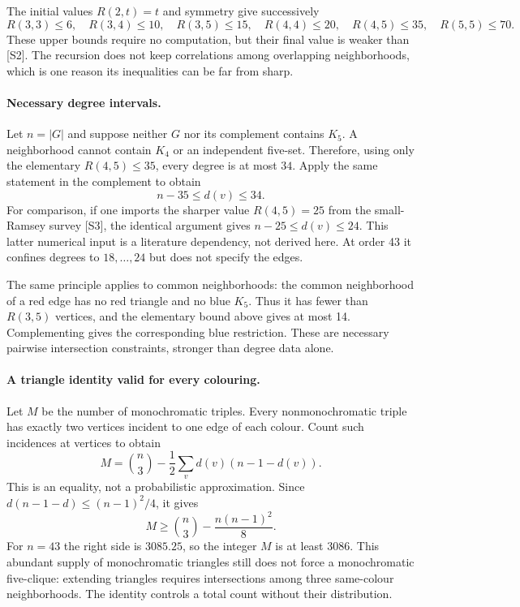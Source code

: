 \documentclass[11pt,a4paper]{article}
\begin{document}
The initial values $R(2,t)=t$ and symmetry give successively
\[
R(3,3)\le6,\quad R(3,4)\le10,\quad R(3,5)\le15,
\quad R(4,4)\le20,\quad R(4,5)\le35,
\quad R(5,5)\le70.
\]
These upper bounds require no computation, but their final value is weaker than [S2]. The recursion does not keep correlations among overlapping neighborhoods, which is one reason its inequalities can be far from sharp.

\paragraph{Necessary degree intervals.}
Let $n=|G|$ and suppose neither $G$ nor its complement contains $K_5$. A neighborhood cannot contain $K_4$ or an independent five-set. Therefore, using only the elementary $R(4,5)\le35$, every degree is at most $34$. Apply the same statement in the complement to obtain
\[
n-35\le d(v)\le34.
\]
For comparison, if one imports the sharper value $R(4,5)=25$ from the small-Ramsey survey [S3], the identical argument gives $n-25\le d(v)\le24$. This latter numerical input is a literature dependency, not derived here. At order 43 it confines degrees to $18,\ldots,24$ but does not specify the edges.

The same principle applies to common neighborhoods: the common neighborhood of a red edge has no red triangle and no blue $K_5$. Thus it has fewer than $R(3,5)$ vertices, and the elementary bound above gives at most 14. Complementing gives the corresponding blue restriction. These are necessary pairwise intersection constraints, stronger than degree data alone.

\paragraph{A triangle identity valid for every colouring.}
Let $M$ be the number of monochromatic triples. Every nonmonochromatic triple has exactly two vertices incident to one edge of each colour. Count such incidences at vertices to obtain
\[
M=\binom n3-\frac12\sum_v d(v)(n-1-d(v)).
\]
This is an equality, not a probabilistic approximation. Since $d(n-1-d)\le (n-1)^2/4$, it gives
\[
M\ge \binom n3-\frac{n(n-1)^2}{8}.
\]
For $n=43$ the right side is $3085.25$, so the integer $M$ is at least 3086. This abundant supply of monochromatic triangles still does not force a monochromatic five-clique: extending triangles requires intersections among three same-colour neighborhoods. The identity controls a total count without their distribution.
\end{document}
